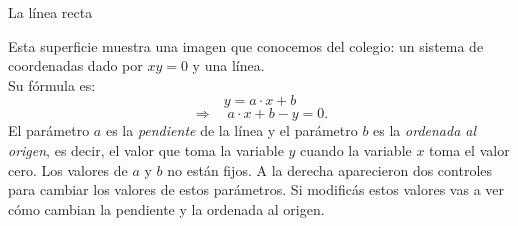 \documentclass[es]{SurferDesc}%
\begin{document}
\footnotesize
%
 
\begin{surferPage}
  \begin{surferTitle}La l\'inea recta\end{surferTitle}
   \begin{surferText}
   
Esta superficie muestra una imagen que conocemos del colegio: un sistema de coordenadas dado por $xy=0$  y una l\'inea.\\
Su f\'ormula es:
\[y=a\cdot x + b\]
\[ \Rightarrow \quad a\cdot x +b -y=0.\]
El par\'ametro $a$ es la {\it pendiente} de la l\'inea y el par\'ametro $b$ es la {\it ordenada al origen}, es decir, el valor que toma la variable $y$ cuando la variable $x$ toma el valor cero.
\newline \newline
Los valores de $a$ y $b$ no est\'an fijos. A la derecha aparecieron dos controles para cambiar los valores de estos par\'ametros. Si modific\'as estos valores vas a ver c\'omo cambian la pendiente y la ordenada al origen.

     \end{surferText}
\end{surferPage}
\end{document}
